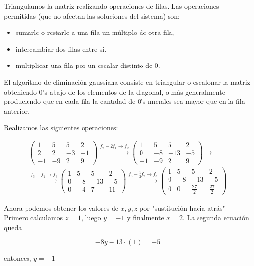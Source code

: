 Triangulamos la matriz realizando operaciones de filas. Las operaciones permitidas (que no afectan las soluciones del sistema) son:
\begin{itemize}
\item  sumarle o restarle a una fila un múltiplo de otra fila,
\item  intercambiar dos filas entre si.
\item  multiplicar una fila por un escalar distinto de 0.
\end{itemize}

El algoritmo de eliminación gaussiana consiste en triangular o escalonar la matriz obteniendo 0's abajo de los elementos de la diagonal, o más generalmente, produciendo que en cada fila la cantidad de 0's iniciales sea mayor que en la fila anterior.

Realizamos las siguientes operaciones:

\begin{align*}
\left(
\begin{array}{rrr|r}1&5&5&2\\2&2&-3&-1\\-1&-9&2&9\end{array}
\right)
\xrightarrow{f_2 - 2 f_1 \rightarrow f_2}
\left(
\begin{array}{rrr|r}1&5&5&2\\0&-8&-13&-5\\-1&-9&2&9\end{array}
\right)
\rightarrow  \\
\xrightarrow{f_3 + f_1 \rightarrow f_3}
\left(
\begin{array}{rrr|r}1&5&5&2\\0&-8&-13&-5\\0&-4&7&11\end{array}
\right)
\xrightarrow{f_3 - \frac12 f_2 \rightarrow f_3}
\left(
\begin{array}{rrr|r}1&5&5&2\\0&-8&-13&-5\\0&0&\frac{27}{2}&\frac{27}{2}\end{array}
\right)
\end{align*}


Ahora podemos obtener los valores de $x, y, z$ por "sustitución hacia atrás". Primero calculamos $z = 1$, luego $y = -1$ y finalmente $x = 2$. La segunda ecuación queda

$$
-8y -13 \cdot (1)=-5
$$

entonces, $y = -1$.

